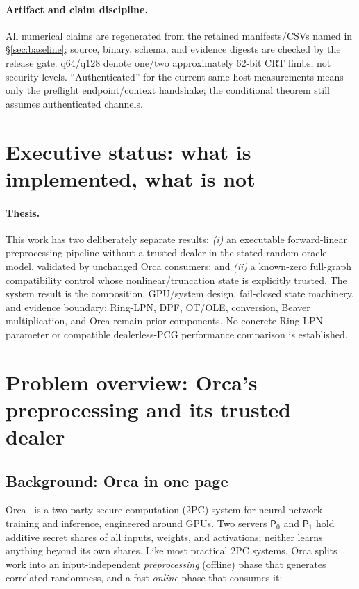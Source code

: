 \documentclass[11pt]{article}
\newcommand{\ServerZero}{\mathsf{P}_0}
\newcommand{\ServerOne}{\mathsf{P}_1}
\begin{document}
\paragraph{Artifact and claim discipline.}
All numerical claims are regenerated from the retained manifests/CSVs named in
\S\ref{sec:baseline}; source, binary, schema, and evidence digests are checked by
the release gate. q64/q128 denote one/two approximately 62-bit CRT limbs, not
security levels. ``Authenticated'' for the current same-host measurements means
only the preflight endpoint/context handshake; the conditional theorem still
assumes authenticated channels.

\section{Executive status: what is implemented, what is not}

\paragraph{Thesis.}
This work has two deliberately separate results:
\emph{(i)} an executable forward-linear preprocessing pipeline without a
trusted dealer in the stated random-oracle model, validated by unchanged Orca
consumers; and \emph{(ii)} a known-zero full-graph compatibility control whose
nonlinear/truncation state is explicitly trusted. The system result is the
composition, GPU/system design, fail-closed state machinery, and evidence
boundary; Ring-LPN, DPF, OT/OLE, conversion, Beaver multiplication, and Orca
remain prior components. No concrete Ring-LPN parameter or compatible
dealerless-PCG performance comparison is established.

\section{Problem overview: Orca's preprocessing and its trusted dealer}
\label{sec:problem}

\subsection{Background: Orca in one page}
\label{sec:orca}

Orca~\cite{jawalkar2024orca} is a two-party secure computation (2PC) system
for neural-network training and inference, engineered around GPUs. Two servers
$\ServerZero$ and $\ServerOne$ hold additive secret shares of all inputs,
weights, and activations; neither learns anything beyond its own shares.
Like most practical 2PC systems, Orca splits work into an input-independent
\emph{preprocessing} (offline) phase that generates correlated randomness, and
a fast \emph{online} phase that consumes it:
\end{document}
